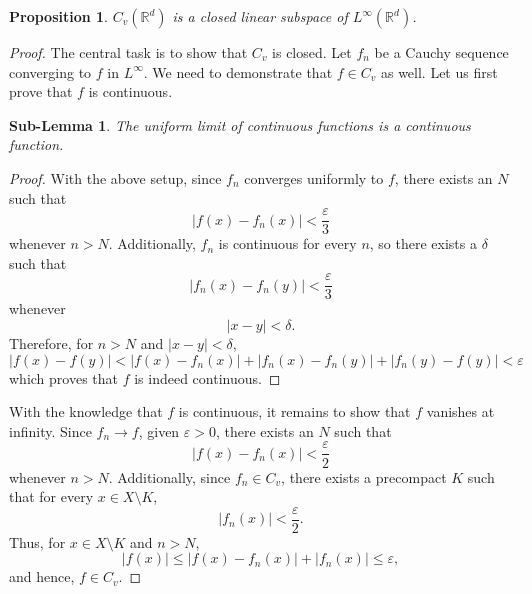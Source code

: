 \documentclass[letterpaper,twoside,12pt]{article}
\theoremstyle{mystyle}
\newtheorem{slem}{Sub-Lemma}
\newtheorem{prop}{Proposition}[section]
\newcommand{\R}{{\mathbb R}}
\newcommand{\cbk}{\color{black}}
\newcommand{\cblu}{\color{blue}}
\begin{document}
\begin{prop}
  $C_v\left( \R^d \right)$ is a closed linear subspace of $L^\infty\left( \R^d \right)$. 
\end{prop}
\begin{proof}
  The central task is to show that $C_v$ is closed. Let $f_n$ be a Cauchy sequence converging to $f$ in $L^\infty$. We need to demonstrate that $f\in C_v$ as well. Let us first prove that $f$ is continuous.
  \cblu 
  \begin{slem}
    The uniform limit of continuous functions is a continuous function.
  \end{slem}
  \begin{proof}
    With the above setup, since $f_n$ converges uniformly to $f$, there exists an $N$ such that 
    \[\left| {f\left( x \right) - {f_n}\left( x \right)} \right| < \frac{\varepsilon }{3}\]
    whenever $n > N$. 
    Additionally, $f_n$ is continuous for every $n$, so there exists a $\delta$ such that 
    \[\left| {{f_n}\left( x \right) - {f_n}\left( y \right)} \right| < \frac{\varepsilon }{3}\] 
    whenever 
    \[\left| {x - y} \right| < \delta .\]
    Therefore, for $n>N$ and $\left| x-y\right| < \delta$,
    \[\left| {f\left( x \right) - f\left( y \right)} \right| < \left| {f\left( x \right) - {f_n}\left( x \right)} \right| + \left| {{f_n}\left( x \right) - {f_n}\left( y \right)} \right| + \left| {{f_n}\left( y \right) - f\left( y \right)} \right| < \varepsilon \]
    which proves that $f$ is indeed continuous.
  \end{proof}
  \cbk 
  With the knowledge that $f$ is continuous, it remains to show that $f$ vanishes at infinity. Since $f_n \to f$, given $\varepsilon > 0$, there exists an $N$ such that 
  \[\left| {f\left( x \right) - {f_n}\left( x \right)} \right| < \frac{\varepsilon }{2}\]
  whenever $n > N$. Additionally, since $f_n \in C_v$, there exists a precompact $K$ such that for every $x \in X\setminus K$, 
  \[\left| {{f_n}\left( x \right)} \right| < \frac{\varepsilon}{2}. \]
  Thus, for $x \in X\setminus K$ and $n>N$, 
  \[\left| {f\left( x \right)} \right| \leqslant \left| {f\left( x \right) - {f_n}\left( x \right)} \right| + \left| {{f_n}\left( x \right)} \right| \leqslant \varepsilon ,\]
  and hence, $f\in C_v$. 

\end{proof}
\end{document}
